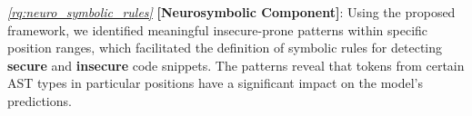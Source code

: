 
\begin{boxK}
    \textit{\ref{rq:neuro_symbolic_rules}} \textbf{[Neurosymbolic Component]}: Using the proposed \framework framework, we identified meaningful insecure-prone patterns within specific position ranges, which facilitated the definition of symbolic rules for detecting \textbf{secure} and \textbf{insecure} code snippets. The patterns reveal that tokens from certain AST types in particular positions have a significant impact on the model’s predictions.
\end{boxK}
